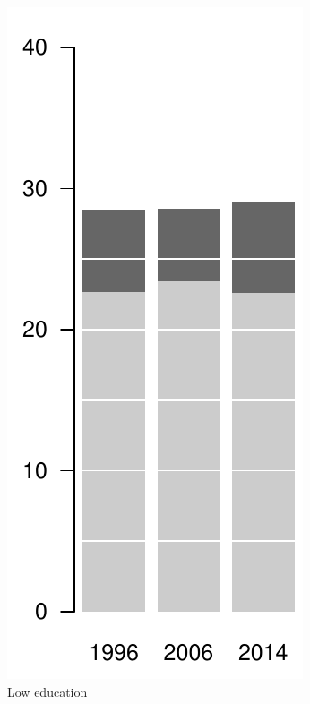 \begin{figure}[ht!]
\begin{subfigure}[b]{0.2\textwidth}
        \includegraphics[scale=.5]{Figures/bar_fem_pri.pdf}
        \caption{Low education}
    \end{subfigure}
    ~ %
    \begin{subfigure}[b]{0.2\textwidth}

\end{subfigure}
\end{figure}
